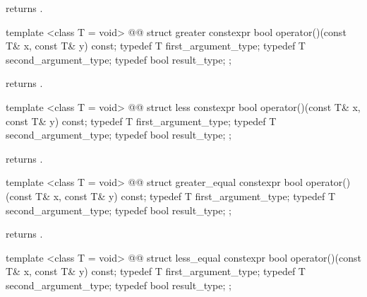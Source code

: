 \begin{itemdescr}
\pnum
{} returns .
\end{itemdescr}

%
\begin{itemdecl}
template <class T = void>
  @@
struct greater {
  constexpr bool operator()(const T& x, const T& y) const;
  typedef T first_argument_type;
  typedef T second_argument_type;
  typedef bool result_type;
};
\end{itemdecl}

\begin{itemdescr}
\pnum
{} returns .
\end{itemdescr}

%
\begin{itemdecl}
template <class T = void>
  @@
struct less {
  constexpr bool operator()(const T& x, const T& y) const;
  typedef T first_argument_type;
  typedef T second_argument_type;
  typedef bool result_type;
};
\end{itemdecl}

\begin{itemdescr}
\pnum
{} returns .
\end{itemdescr}

%
\begin{itemdecl}
template <class T = void>
  @@
struct greater_equal {
  constexpr bool operator()(const T& x, const T& y) const;
  typedef T first_argument_type;
  typedef T second_argument_type;
  typedef bool result_type;
};
\end{itemdecl}

\begin{itemdescr}
\pnum
{} returns .
\end{itemdescr}

%
\begin{itemdecl}
template <class T = void>
  @@
struct less_equal {
  constexpr bool operator()(const T& x, const T& y) const;
  typedef T first_argument_type;
  typedef T second_argument_type;
  typedef bool result_type;
};
\end{itemdecl}

